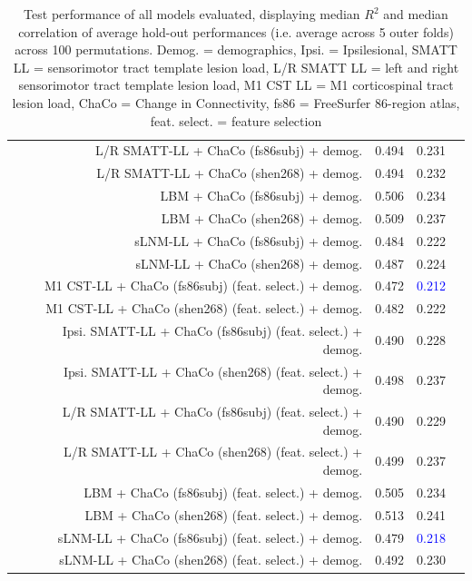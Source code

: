 \documentclass[10pt]{article}
\newcommand{\colorProcessBlue}[1]{\textcolor{ProcessBlue}{#1}}
\newcommand{\colorNavyBlue}[1]{\textcolor{NavyBlue}{#1}}
\newcommand{\colorBlue}[1]{\textcolor{Blue}{#1}}
\begin{document}
\begin{table}[h]
\begin{tabular}{lrrrr}
 & L/R SMATT-LL + ChaCo (fs86subj) + demog. & \colorProcessBlue{0.494} & \colorProcessBlue{0.231} \\
 & L/R SMATT-LL + ChaCo (shen268) + demog. & \colorProcessBlue{0.494} & \colorProcessBlue{0.232} \\
 & LBM + ChaCo (fs86subj) + demog. & \colorProcessBlue{0.506} & \colorProcessBlue{0.234} \\
 & LBM + ChaCo (shen268) + demog. & \colorProcessBlue{0.509} & \colorProcessBlue{0.237} \\
 & sLNM-LL + ChaCo (fs86subj) + demog. & \colorNavyBlue{0.484} & \colorNavyBlue{0.222} \\
 & sLNM-LL + ChaCo (shen268) + demog. & \colorNavyBlue{0.487} & \colorNavyBlue{0.224} \\
 & M1 CST-LL + ChaCo (fs86subj) (feat. select.) + demog. & \colorNavyBlue{0.472} & \colorBlue{0.212} \\
 & M1 CST-LL + ChaCo (shen268) (feat. select.) + demog. & \colorNavyBlue{0.482} & \colorNavyBlue{0.222} \\
 & Ipsi. SMATT-LL + ChaCo (fs86subj) (feat. select.) + demog. & \colorProcessBlue{0.490} & \colorNavyBlue{0.228} \\
 & Ipsi. SMATT-LL + ChaCo (shen268) (feat. select.) + demog. & \colorProcessBlue{0.498} & \colorProcessBlue{0.237} \\
 & L/R SMATT-LL + ChaCo (fs86subj) (feat. select.) + demog. & \colorProcessBlue{0.490} & \colorNavyBlue{0.229} \\
 & L/R SMATT-LL + ChaCo (shen268) (feat. select.) + demog. & \colorProcessBlue{0.499} & \colorProcessBlue{0.237} \\
 & LBM + ChaCo (fs86subj) (feat. select.) + demog. & \colorProcessBlue{0.505} & \colorProcessBlue{0.234} \\
 & LBM + ChaCo (shen268) (feat. select.) + demog. & \colorProcessBlue{0.513} & \colorProcessBlue{0.241} \\
 & sLNM-LL + ChaCo (fs86subj) (feat. select.) + demog. & \colorNavyBlue{0.479} & \colorBlue{0.218} \\
 & sLNM-LL + ChaCo (shen268) (feat. select.) + demog. & \colorProcessBlue{0.492} & \colorProcessBlue{0.230} \\


\bottomrule
\end{tabular}
\caption{Test performance of all models evaluated, displaying median $R^2$ and median correlation of average hold-out performances (i.e. average across 5 outer folds) across 100 permutations. Demog. = demographics, Ipsi. = Ipsilesional, SMATT LL = sensorimotor tract template lesion load, L/R SMATT LL = left and right sensorimotor tract template lesion load, M1 CST LL = M1 corticospinal tract lesion load, ChaCo = Change in Connectivity, fs86 = FreeSurfer 86-region atlas, feat. select. = feature selection}
\label{results_table_acutechronic}
\end{table}
\end{document}
